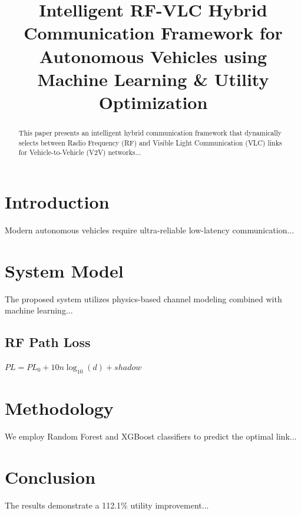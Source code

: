 \documentclass[conference]{IEEEtran}
\begin{document}
\title{Intelligent RF-VLC Hybrid Communication Framework for Autonomous Vehicles using Machine Learning \& Utility Optimization}

\author{
}

\maketitle

\begin{abstract}
This paper presents an intelligent hybrid communication framework that dynamically selects between Radio Frequency (RF) and Visible Light Communication (VLC) links for Vehicle-to-Vehicle (V2V) networks...
\end{abstract}

\section{Introduction}
Modern autonomous vehicles require ultra-reliable low-latency communication...

\section{System Model}
The proposed system utilizes physics-based channel modeling combined with machine learning...

\subsection{RF Path Loss}
$PL = PL_0 + 10n\log_{10}(d) + shadow$

\section{Methodology}
We employ Random Forest and XGBoost classifiers to predict the optimal link...

\section{Conclusion}
The results demonstrate a 112.1\% utility improvement...
\end{document}
